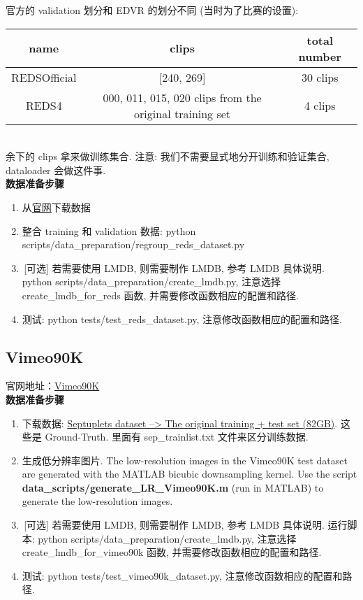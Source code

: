 \documentclass[../main.tex]{subfiles}
\begin{document}
官方的 validation 划分和 EDVR 的划分不同 (当时为了比赛的设置):\\
\begin{table}[htbp]
    \centering
    {
        \begin{tabular}{|c|c|c|}
            \hline
            \textbf{name} & \textbf{clips} & \textbf{total number}                               \\ \hline
            REDSOfficial              & [240, 269]      & 30 clips                               \\ \hline
            REDS4          & 000, 011, 015, 020 clips from the original training set      & 4 clips       \\ \hline
        \end{tabular}
    }
\end{table}\\
余下的 clips 拿来做训练集合. 注意: 我们不需要显式地分开训练和验证集合, dataloader 会做这件事.\\

\noindent\textbf{数据准备步骤}

\begin{enumerate}
\item 从\href{https://seungjunnah.github.io/Datasets/reds.html}{官网}下载数据
\item 整合 training 和 validation 数据: python scripts/data\_preparation/regroup\_reds\_dataset.py
\item\,[可选] 若需要使用 LMDB, 则需要制作 LMDB, 参考 LMDB 具体说明. python scripts/data\_preparation/create\_lmdb.py, 注意选择 create\_lmdb\_for\_reds 函数, 并需要修改函数相应的配置和路径.
\item 测试: python tests/test\_reds\_dataset.py, 注意修改函数相应的配置和路径.
\end{enumerate}

\subsection{Vimeo90K}

官网地址：\href{http://toflow.csail.mit.edu/}{Vimeo90K}\\

\noindent\textbf{数据准备步骤}
\begin{enumerate}
\item 下载数据: \href{http://data.csail.mit.edu/tofu/dataset/vimeo_septuplet.zip}{Septuplets dataset --> The original training + test set (82GB)}. 这些是 Ground-Truth. 里面有 sep\_trainlist.txt 文件来区分训练数据.
\item 生成低分辨率图片. The low-resolution images in the Vimeo90K test dataset are generated with the MATLAB bicubic downsampling kernel. Use the script \textbf{data\_scripts/generate\_LR\_Vimeo90K.m} (run in MATLAB) to generate the low-resolution images.
\item\,[可选] 若需要使用 LMDB, 则需要制作 LMDB, 参考 LMDB 具体说明. 运行脚本: python scripts/data\_preparation/create\_lmdb.py, 注意选择 create\_lmdb\_for\_vimeo90k 函数, 并需要修改函数相应的配置和路径.
\item 测试: python tests/test\_vimeo90k\_dataset.py, 注意修改函数相应的配置和路径.
\end{enumerate}
\end{document}
